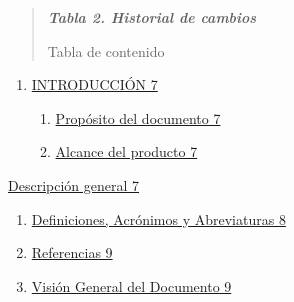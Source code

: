 \documentclass[
]{article}
\begin{document}
\begin{quote}
\protect{}\label{_bookmark2}{}\emph{\textbf{Tabla 2.
Historial de cambios}}

Tabla de contenido
\end{quote}

\begin{enumerate}
\def\labelenumi{\arabic{enumi}.}
\item
  \hyperref[introducciuxf3n]{INTRODUCCIÓN 7}

  \begin{enumerate}
  \def\labelenumii{\arabic{enumii}.}
  \item
    \hyperref[propuxf3sito-del-documento]{Propósito del documento 7}
  \item
    \hyperref[alcance-del-producto]{Alcance del producto 7}
  \end{enumerate}
\end{enumerate}

\hyperref[descripciuxf3n-general]{Descripción general 7}

\begin{enumerate}
\def\labelenumi{\arabic{enumi}.}
\setcounter{enumi}{2}
\item
  \hyperref[definiciones-acruxf3nimos-y-abreviaturas]{Definiciones,
  Acrónimos y Abreviaturas 8}
\item
  \hyperref[referencias]{Referencias 9}
\item
  \hyperref[visiuxf3n-general-del-documento]{Visión General del
  Documento 9}
\end{enumerate}
\end{document}

